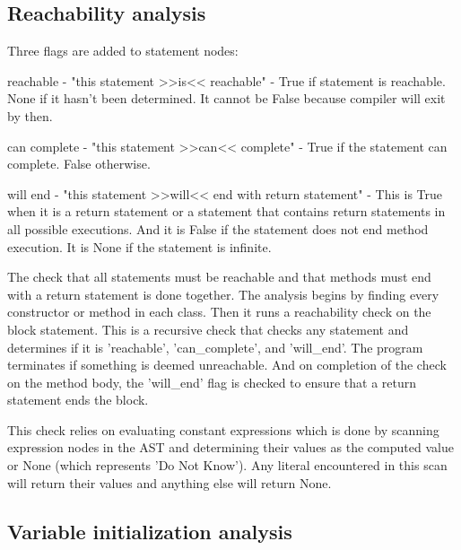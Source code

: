 \documentclass[12pt]{article}
\begin{document}
\subsection{Reachability analysis}
Three flags are added to statement nodes:

reachable - "this statement >>is<< reachable" -
    True if statement is reachable. None if it hasn't been determined.
    It cannot be False because compiler will exit by then.

can complete - "this statement >>can<< complete" -
    True if the statement can complete. False otherwise.

will end - "this statement >>will<< end with return statement" -
    This is True when it is a return statement
    or a statement that contains return statements in all possible
    executions.
    And it is False if the statement does not end method execution.
    It is None if the statement is infinite.

The check that all statements must be reachable and that methods must end with
a return statement is done together.
The analysis begins by finding every constructor or method in each class.
Then it runs a reachability check on the block statement.
This is a recursive check that checks any statement and determines if it is
'reachable', 'can_complete', and 'will_end'.
The program terminates if something is deemed
unreachable. And on completion of the check on the method body, the 'will_end'
flag is checked to ensure that a return statement ends the block.

This check relies on evaluating constant expressions which is done by scanning expression
nodes in the AST and determining their values as the computed value or None
(which represents 'Do Not Know'). Any literal encountered in this scan will return their
values and anything else will return None.

\subsection{Variable initialization analysis}
\end{document}
